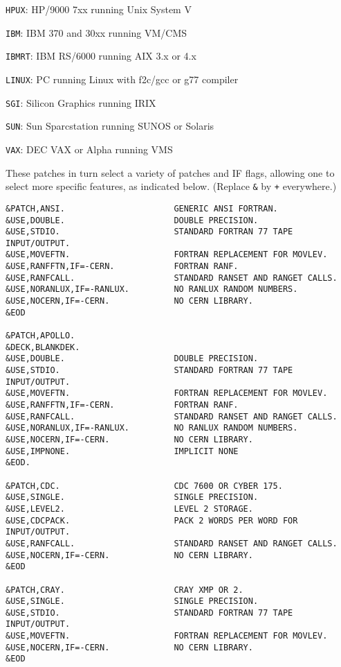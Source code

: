       \verb|HPUX|: HP/9000 7xx running Unix System V

      \verb|IBM|: IBM 370 and 30xx running VM/CMS 

      \verb|IBMRT|: IBM RS/6000 running AIX 3.x or 4.x

      \verb|LINUX|: PC running Linux with f2c/gcc or g77 compiler

      \verb|SGI|: Silicon Graphics running IRIX

      \verb|SUN|: Sun Sparcstation running SUNOS or Solaris

      \verb|VAX|: DEC VAX or Alpha running VMS

\noindent These patches in turn select a variety of patches and IF
flags, allowing one to select more specific features, as indicated
below. (Replace \verb|&| by \verb|+| everywhere.)
\begin{verbatim}
&PATCH,ANSI.                      GENERIC ANSI FORTRAN.
&USE,DOUBLE.                      DOUBLE PRECISION.
&USE,STDIO.                       STANDARD FORTRAN 77 TAPE INPUT/OUTPUT.
&USE,MOVEFTN.                     FORTRAN REPLACEMENT FOR MOVLEV.
&USE,RANFFTN,IF=-CERN.            FORTRAN RANF.
&USE,RANFCALL.                    STANDARD RANSET AND RANGET CALLS.
&USE,NORANLUX,IF=-RANLUX.         NO RANLUX RANDOM NUMBERS.
&USE,NOCERN,IF=-CERN.             NO CERN LIBRARY.
&EOD

&PATCH,APOLLO.
&DECK,BLANKDEK.
&USE,DOUBLE.                      DOUBLE PRECISION.
&USE,STDIO.                       STANDARD FORTRAN 77 TAPE INPUT/OUTPUT.
&USE,MOVEFTN.                     FORTRAN REPLACEMENT FOR MOVLEV.
&USE,RANFFTN,IF=-CERN.            FORTRAN RANF.
&USE,RANFCALL.                    STANDARD RANSET AND RANGET CALLS.
&USE,NORANLUX,IF=-RANLUX.         NO RANLUX RANDOM NUMBERS.
&USE,NOCERN,IF=-CERN.             NO CERN LIBRARY.
&USE,IMPNONE.                     IMPLICIT NONE
&EOD.

&PATCH,CDC.                       CDC 7600 OR CYBER 175.
&USE,SINGLE.                      SINGLE PRECISION.
&USE,LEVEL2.                      LEVEL 2 STORAGE.
&USE,CDCPACK.                     PACK 2 WORDS PER WORD FOR INPUT/OUTPUT.
&USE,RANFCALL.                    STANDARD RANSET AND RANGET CALLS.
&USE,NOCERN,IF=-CERN.             NO CERN LIBRARY.
&EOD

&PATCH,CRAY.                      CRAY XMP OR 2.
&USE,SINGLE.                      SINGLE PRECISION.
&USE,STDIO.                       STANDARD FORTRAN 77 TAPE INPUT/OUTPUT.
&USE,MOVEFTN.                     FORTRAN REPLACEMENT FOR MOVLEV.
&USE,NOCERN,IF=-CERN.             NO CERN LIBRARY.
&EOD


\end{verbatim}
